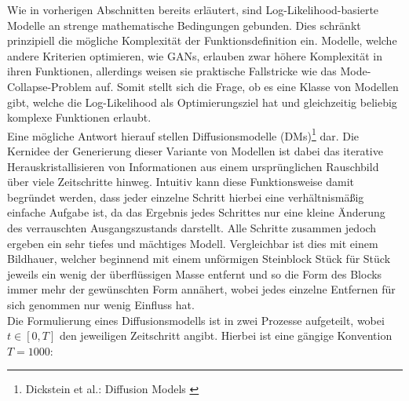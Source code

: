 Wie in vorherigen Abschnitten bereits erläutert, sind Log-Likelihood-basierte Modelle an strenge mathematische Bedingungen gebunden. Dies schränkt prinzipiell die mögliche Komplexität der Funktionsdefinition ein. Modelle, welche andere Kriterien optimieren, wie \ac{GAN}s, erlauben zwar höhere Komplexität in ihren Funktionen, allerdings weisen sie praktische Fallstricke wie das Mode-Collapse-Problem auf. Somit stellt sich die Frage, ob es eine Klasse von Modellen gibt, welche die Log-Likelihood als Optimierungsziel hat und gleichzeitig beliebig komplexe Funktionen erlaubt. \\
Eine mögliche Antwort hierauf stellen Diffusionsmodelle (DMs)\footnote{
    Dickstein et al.: Diffusion Models
    \cite{pmlr-v37-sohl-dickstein15}
} dar. Die Kernidee der Generierung dieser Variante von Modellen ist dabei das iterative Herauskristallisieren von Informationen aus einem ursprünglichen Rauschbild über viele Zeitschritte hinweg. Intuitiv kann diese Funktionsweise damit begründet werden, dass jeder einzelne Schritt hierbei eine verhältnismäßig einfache Aufgabe ist, da das Ergebnis jedes Schrittes nur eine kleine Änderung des verrauschten Ausgangszustands darstellt. Alle Schritte zusammen jedoch ergeben ein sehr tiefes und mächtiges Modell. Vergleichbar ist dies mit einem Bildhauer, welcher beginnend mit einem unförmigen Steinblock Stück für Stück jeweils ein wenig der überflüssigen Masse entfernt und so die Form des Blocks immer mehr der gewünschten Form annähert, wobei jedes einzelne Entfernen für sich genommen nur wenig Einfluss hat.\\
Die Formulierung eines Diffusionsmodells ist in zwei Prozesse aufgeteilt, wobei $t \in [0,T]$ den jeweiligen Zeitschritt angibt. Hierbei ist eine gängige Konvention $T=1000$: 
